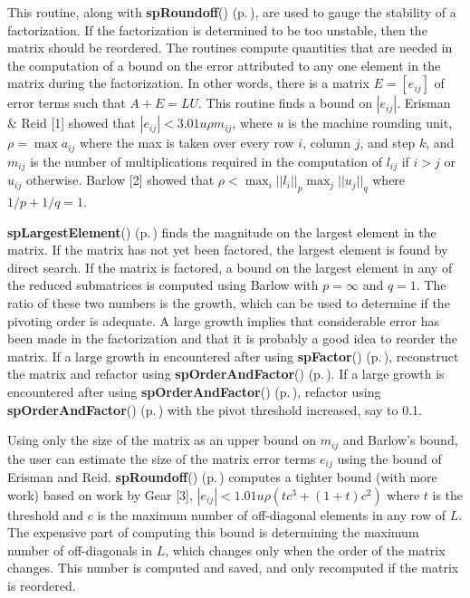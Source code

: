 This routine, along with {\bf sp\-Roundoff}() {\rm (p.\,\pageref{spMatrix_8h_a50})}, are used to gauge the stability of a factorization. If the factorization is determined to be too unstable, then the matrix should be reordered. The routines compute quantities that are needed in the computation of a bound on the error attributed to any one element in the matrix during the factorization. In other words, there is a matrix $ E = [e_{ij}] $ of error terms such that $ A+E = LU $. This routine finds a bound on $ |e_{ij}| $. Erisman \& Reid [1] showed that $ |e_{ij}| < 3.01 u \rho m_{ij} $, where $ u $ is the machine rounding unit, $ \rho = \max a_{ij} $ where the max is taken over every row $ i $, column $ j $, and step $ k $, and $ m_{ij} $ is the number of multiplications required in the computation of $ l_{ij} $ if $ i > j $ or $ u_{ij} $ otherwise. Barlow [2] showed that $ \rho < \max_i || l_i ||_p \max_j || u_j ||_q $ where $ 1/p + 1/q = 1 $.

{\bf sp\-Largest\-Element}() {\rm (p.\,\pageref{spMatrix_8h_a43})} finds the magnitude on the largest element in the matrix. If the matrix has not yet been factored, the largest element is found by direct search. If the matrix is factored, a bound on the largest element in any of the reduced submatrices is computed using Barlow with $ p = \infty $ and $ q = 1 $. The ratio of these two numbers is the growth, which can be used to determine if the pivoting order is adequate. A large growth implies that considerable error has been made in the factorization and that it is probably a good idea to reorder the matrix. If a large growth in encountered after using {\bf sp\-Factor}() {\rm (p.\,\pageref{spMatrix_8h_a30})}, reconstruct the matrix and refactor using {\bf sp\-Order\-And\-Factor}() {\rm (p.\,\pageref{spMatrix_8h_a46})}. If a large growth is encountered after using {\bf sp\-Order\-And\-Factor}() {\rm (p.\,\pageref{spMatrix_8h_a46})}, refactor using {\bf sp\-Order\-And\-Factor}() {\rm (p.\,\pageref{spMatrix_8h_a46})} with the pivot threshold increased, say to 0.1.

Using only the size of the matrix as an upper bound on $ m_{ij} $ and Barlow's bound, the user can estimate the size of the matrix error terms $ e_{ij} $ using the bound of Erisman and Reid. {\bf sp\-Roundoff}() {\rm (p.\,\pageref{spMatrix_8h_a50})}  computes a tighter bound (with more work) based on work by Gear [3], $ |e_{ij}| < 1.01 u \rho (t c^3 + (1 + t)c^2) $ where $ t $ is the threshold and $ c $ is the maximum number of off-diagonal elements in any row of $ L $. The expensive part of computing this bound is determining the maximum number of off-diagonals in $ L $, which changes only when the order of the matrix changes. This number is computed and saved, and only recomputed if the matrix is reordered.

